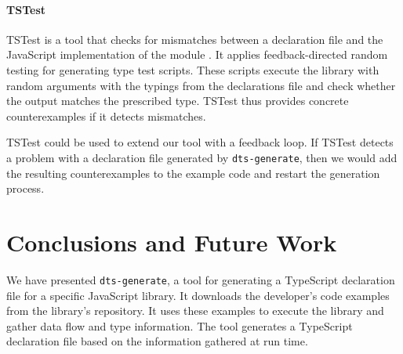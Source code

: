 \documentclass[sigplan,screen]{acmart}
\begin{document}
\paragraph*{TSTest}
TSTest is a tool that checks for mismatches between a declaration file and the JavaScript
implementation of the module \cite{DBLP:journals/pacmpl/KristensenM17}. It applies feedback-directed
random testing for generating type test scripts. These scripts execute the library with
random arguments with the typings from the declarations file and check whether the output
matches the prescribed type. TSTest thus provides concrete counterexamples if it detects mismatches.



TSTest could be used to extend our tool with a feedback loop. If TSTest detects a problem
with a declaration file generated by \texttt{dts-generate}, then we would add the
resulting counterexamples to the example code and restart the generation process. 

\section{Conclusions and Future Work}
\label{sec:conclusion}
We have presented \texttt{dts-generate}, a tool for generating a TypeScript declaration
file for a specific JavaScript library. It downloads the developer's
code examples from the library's repository. It uses these examples to
execute the library and gather data flow and type information. The tool generates a TypeScript declaration
file based on the information gathered at run time.

\end{document}
